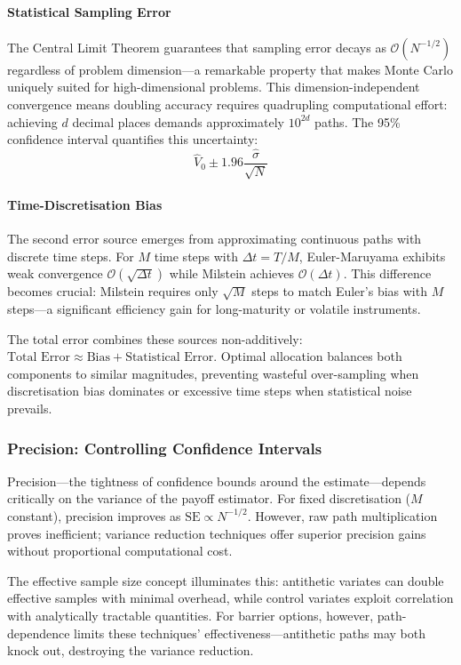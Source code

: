 \documentclass[11pt,a4paper]{article}
\begin{document}
\paragraph{Statistical Sampling Error}
The Central Limit Theorem guarantees that sampling error decays as $\mathcal{O}(N^{-1/2})$ regardless of problem dimension—a remarkable property that makes Monte Carlo uniquely suited for high-dimensional problems. This dimension-independent convergence means doubling accuracy requires quadrupling computational effort: achieving $d$ decimal places demands approximately $10^{2d}$ paths. The 95\% confidence interval quantifies this uncertainty:
\begin{equation}
\hat{V}_0 \pm 1.96\frac{\hat{\sigma}}{\sqrt{N}}
\end{equation}

\paragraph{Time-Discretisation Bias}
The second error source emerges from approximating continuous paths with discrete time steps. For $M$ time steps with $\Delta t = T/M$, Euler-Maruyama exhibits weak convergence $\mathcal{O}(\sqrt{\Delta t})$ while Milstein achieves $\mathcal{O}(\Delta t)$. This difference becomes crucial: Milstein requires only $\sqrt{M}$ steps to match Euler's bias with $M$ steps—a significant efficiency gain for long-maturity or volatile instruments.

The total error combines these sources non-additively: $\text{Total Error} \approx \text{Bias} + \text{Statistical Error}$. Optimal allocation balances both components to similar magnitudes, preventing wasteful over-sampling when discretisation bias dominates or excessive time steps when statistical noise prevails.

\subsubsection{Precision: Controlling Confidence Intervals}

Precision—the tightness of confidence bounds around the estimate—depends critically on the variance of the payoff estimator. For fixed discretisation ($M$ constant), precision improves as $\text{SE} \propto N^{-1/2}$. However, raw path multiplication proves inefficient; variance reduction techniques offer superior precision gains without proportional computational cost.

The effective sample size concept illuminates this: antithetic variates can double effective samples with minimal overhead, while control variates exploit correlation with analytically tractable quantities. For barrier options, however, path-dependence limits these techniques' effectiveness—antithetic paths may both knock out, destroying the variance reduction.
\end{document}
